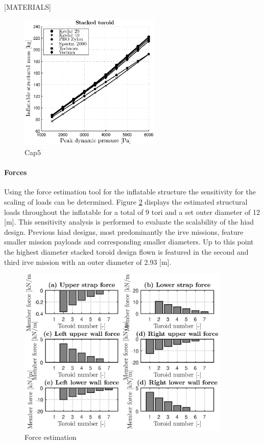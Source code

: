 [MATERIALS]

\begin{figure}[h]
	\centering
	\includegraphics[width=0.6\textwidth]{./Figure/Structure/material_test.eps}
	\caption{Cap5}
	\label{fig:mat}
\end{figure}



\paragraph{Forces}

Using the force estimation tool for the inflatable structure the sensitivity for the scaling of loads can be determined. Figure \ref{fig:forces} displays the estimated structural loads throughout the inflatable for a total of 9 tori and a set outer diameter of 12 [m]. This sensitivity analysis is performed to evaluate the scalability of the \gls{hiad} design. Previous \gls{hiad} designs, most predominantly the \gls{irve} missions, feature smaller mission payloads and corresponding smaller diameters. Up to this point the highest diameter stacked toroid design flown is featured in the second and third \gls{irve} mission with an outer diameter of 2.93 [m]. 

\begin{figure}[h]
	\centering
	\includegraphics[width=0.9\textwidth]{./Figure/Structure/forces_test.eps}
	\caption{Force estimation }
	\label{fig:forces}
\end{figure}


